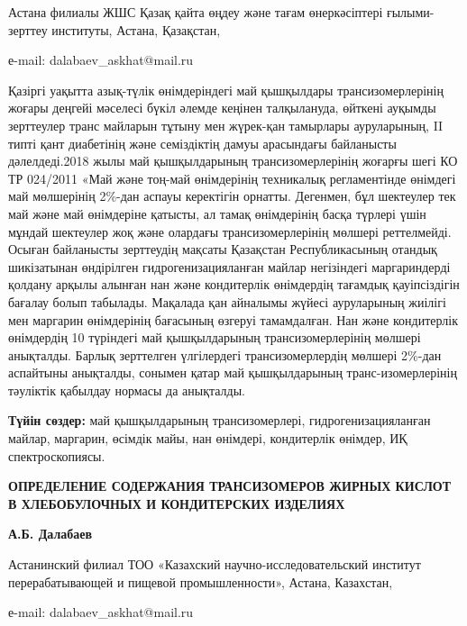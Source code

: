 \begin{affiliation}
Астана филиалы ЖШС Қазақ қайта өңдеу және тағам
өнеркәсіптері ғылыми-зерттеу институты, Астана, Қазақстан,

е-mail: dalabaev\_askhat@mail.ru
\end{affiliation}

Қазіргі уақытта азық-түлік өнімдеріндегі май қышқылдары
трансизомерлерінің жоғары деңгейі мәселесі бүкіл әлемде кеңінен
талқылануда, өйткені ауқымды зерттеулер транс майларын тұтыну мен
жүрек-қан тамырлары ауруларының, II типті қант диабетінің және
семіздіктің дамуы арасындағы байланысты дәлелдеді.2018 жылы май
қышқылдарының трансизомерлерінің жоғарғы шегі КО ТР 024/2011 «Май және
тоң-май өнімдерінің техникалық регламентінде өнімдегі май мөлшерінің
2\%-дан аспауы керектігін орнатты. Дегенмен, бұл шектеулер тек май және
май өнімдеріне қатысты, ал тамақ өнімдерінің басқа түрлері үшін мұндай
шектеулер жоқ және олардағы трансизомерлерінің мөлшері реттелмейді.
Осыған байланысты зерттеудің мақсаты Қазақстан Республикасының отандық
шикізатынан өндірілген гидрогенизацияланған майлар негізіндегі
маргариндерді қолдану арқылы алынған нан және кондитерлік өнімдердің
тағамдық қауіпсіздігін бағалау болып табылады. Мақалада қан айналымы
жүйесі ауруларының жиілігі мен маргарин өнімдерінің бағасының өзгеруі
тамамдалған. Нан және кондитерлік өнімдердің 10 түріндегі май
қышқылдарының трансизомерлерінің мөлшері анықталды. Барлық зерттелген
үлгілердегі трансизомерлердің мөлшері 2\%-дан аспайтыны анықталды,
сонымен қатар май қышқылдарының транс-изомерлерінің тәуліктік қабылдау
нормасы да анықталды.

{\bfseries Түйін сөздер:} май қышқылдарының трансизомерлері,
гидрогенизацияланған майлар, маргарин, өсімдік майы, нан өнімдері,
кондитерлік өнімдер, ИҚ спектроскопиясы.
\newpage
\begin{articleheader}
{\bfseries ОПРЕДЕЛЕНИЕ СОДЕРЖАНИЯ ТРАНСИЗОМЕРОВ ЖИРНЫХ КИСЛОТ В
ХЛЕБОБУЛОЧНЫХ И КОНДИТЕРСКИХ ИЗДЕЛИЯХ}

{\bfseries А.Б. Далабаев}
\end{articleheader}

\begin{affiliation}
Астанинский филиал ТОО «Казахский
научно-исследовательский институт перерабатывающей и пищевой
промышленности», Астана, Казахстан,

е-mail: dalabaev\_askhat@mail.ru
\end{affiliation}

